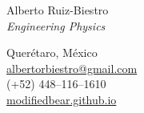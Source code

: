 \documentclass[letterpaper,11pt,notitlepage]{article}
\newcommand{\hmargin}{1.7cm} %
\begin{document}
\pagestyle{fancy}
\begin{minipage}[t][\hmargin][c]{0.60\textwidth}
	
    {\Huge{Alberto Ruiz-Biestro} }\\[0.8em]
	{\color{darkgray}\itshape\Large Engineering Physics}
	
\end{minipage}
\hfill
\begin{minipage}[t][\hmargin][c]{0.35\textwidth}
\raggedleft\color{darkgray}
Querétaro, México\\
\href{mailto:albertorbiestro@gmail.com}{albertorbiestro@gmail.com}\\
(+52) 448--116--1610\\
\href{https://modifiedbear.github.io/}{modifiedbear.github.io}\\
\end{minipage}

\vspace{0.5in}
\end{document}
